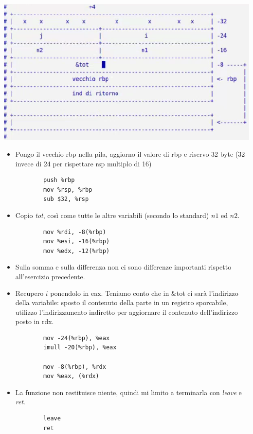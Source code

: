 \begin{center}
	\includegraphics{img/35.PNG}
\end{center}
\begin{itemize}
	\item Pongo il vecchio rbp nella pila, aggiorno il valore di rbp e riservo 32 byte (32 invece di 24 per rispettare rsp multiplo di 16)
	\begin{verbatim}
		push %rbp
		mov %rsp, %rbp
		sub $32, %rsp
	\end{verbatim}
	\item Copio \emph{tot}, così come tutte le altre variabili (secondo lo standard) $n1$ ed $n2$.
	\begin{verbatim}
		mov %rdi, -8(%rbp)
		mov %esi, -16(%rbp)
		mov %edx, -12(%rbp)
	\end{verbatim}
	\item Sulla somma e sulla differenza non ci sono differenze importanti rispetto all'esercizio precedente.
	\item Recupero $i$ ponendolo in eax. Teniamo conto che in \&tot ci sarà l'indirizzo della variabile: sposto il contenuto della parte in un registro sporcabile, utilizzo l'indirizzamento indiretto per aggiornare il contenuto dell'indirizzo posto in rdx.
	\begin{verbatim}
		mov -24(%rbp), %eax
		imull -20(%rbp), %eax
		
		mov -8(%rbp), %rdx
		mov %eax, (%rdx)
	\end{verbatim}
	\item La funzione non restituisce niente, quindi mi limito a terminarla con \emph{leave} e \emph{ret}.
	\begin{verbatim}
		leave
		ret
	\end{verbatim}
\end{itemize}
